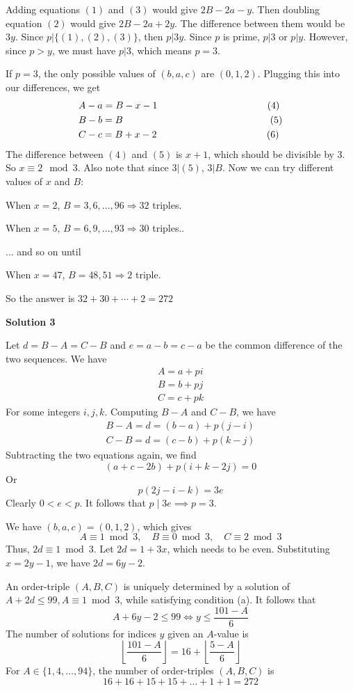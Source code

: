 \begin{enumerate}
 Adding equations $(1)$ and $(3)$ would give $2B - 2a - y$. Then doubling equation $(2)$ would give $2B - 2a + 2y$. The difference between them would be $3y$. Since $p|\{(1), (2), (3)\}$, then $p|3y$. Since $p$ is prime, $p|3$ or $p|y$. However, since $p > y$, we must have $p|3$, which means $p=3$.

 
If $p=3$, the only possible values of $(b, a, c)$ are $(0, 1, 2)$. Plugging this into our differences, we get 
 \begin{align*}  &A-a = B-x-1 \hspace{4cm}(4)\\  &B - b = B \hspace{5.35cm}(5)\\  &C - c = B+x-2 \hspace{4cm}(6) \end{align*}
The difference between $(4)$ and $(5)$ is $x+1$, which should be divisible by 3. So $x \equiv 2 \mod 3$. Also note that since $3|(5)$, $3|B$. Now we can try different values of $x$ and $B$:

 When $x=2$, $B=3, 6, ..., 96 \Rightarrow 32$ triples.

 When $x=5$, $B=6, 9, ..., 93\Rightarrow 30$ triples..

 ... and so on until

 When $x=47$, $B=48, 51\Rightarrow 2$ triple. 

 So the answer is $32 + 30 + \cdots + 2 = \boxed{272}$




\textbf{Solution 3}

Let $d=B-A=C-B$ and $e=a-b=c-a$ be the common difference of the two sequences. We have \begin{align*}A=a+pi\\B=b+pj\\C=c+pk\end{align*}
For some integers $i,j,k$. Computing $B-A$ and $C-B$, we have\begin{align*}B-A=d=(b-a)+p(j-i)\\C-B=d=(c-b)+p(k-j)\end{align*}
Subtracting the two equations again, we find
 \[(a+c-2b)+p(i+k-2j)=0\]Or
 \[p(2j-i-k)=3e\]Clearly $0<e<p$. It follows that $p\mid 3e\implies p=3$. 

 We have $(b,a,c)=(0,1,2)$, which gives 
 \[A\equiv 1\bmod{3},\quad B\equiv 0\bmod{3},\quad C\equiv 2\bmod{3}\]Thus, $2d\equiv 1\bmod{3}$. Let $2d=1+3x$, which needs to be even. Substituting $x=2y-1$, we have $2d=6y-2$. 

 An order-triple $(A,B,C)$ is uniquely determined by a solution of $A+2d\le 99, A\equiv 1\bmod{3}$, while satisfying condition (a). It follows that
 \[A+6y-2\le 99\iff y\le\frac{101-A}{6}\]The number of solutions for indices $y$ given an $A$-value is
 \[\left\lfloor \frac{101-A}{6}\right\rfloor=16+\left\lfloor\frac{5-A}{6}\right\rfloor\]For $A\in \{1,4,\ldots, 94\}$, the number of order-triples $(A,B,C)$ is
 \[16+16+15+15+\ldots+1+1=\boxed{272}\]



\end{enumerate}